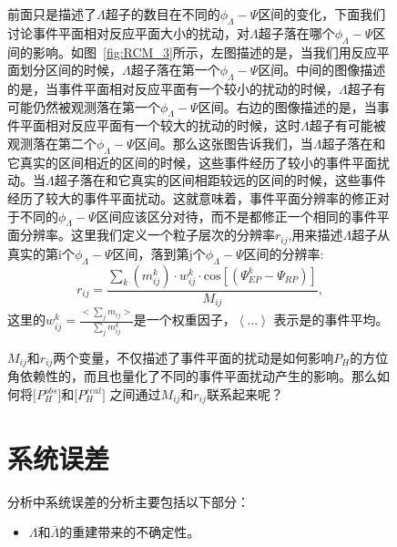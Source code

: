 \begin{figure}[htbp]
前面只是描述了$\Lambda$超子的数目在不同的$\phi_{\Lambda}-\Psi$区间的变化，下面我们讨论事件平面相对反应平面大小的扰动，对$\Lambda$超子落在哪个$\phi_{\Lambda}-\Psi$区间的影响。如图~\ref{fig:RCM_3}所示，左图描述的是，当我们用反应平面划分区间的时候，$\Lambda$超子落在第一个$\phi_{\Lambda}-\Psi$区间。中间的图像描述的是，当事件平面相对反应平面有一个较小的扰动的时候，$\Lambda$超子有可能仍然被观测落在第一个$\phi_{\Lambda}-\Psi$区间。右边的图像描述的是，当事件平面相对反应平面有一个较大的扰动的时候，这时$\Lambda$超子有可能被观测落在第二个$\phi_{\Lambda}-\Psi$区间。那么这张图告诉我们，当$\Lambda$超子落在和它真实的区间相近的区间的时候，这些事件经历了较小的事件平面扰动。当$\Lambda$超子落在和它真实的区间相距较远的区间的时候，这些事件经历了较大的事件平面扰动。这就意味着，事件平面分辨率的修正对于不同的$\phi_{\Lambda}-\Psi$区间应该区分对待，而不是都修正一个相同的事件平面分辨率。这里我们定义一个粒子层次的分辨率$r_{ij}$,用来描述$\Lambda$超子从真实的第i个$\phi_{\Lambda}-\Psi$区间，落到第j个$\phi_{\Lambda}-\Psi$区间的分辨率:
\begin{equation}
\label{eq:r_ij}
r_{ij} = \frac{\sum_{k} (m^{k}_{ij}) \cdot w_{ij}^k \cdot \mathrm{cos}[(\Psi_{EP}^{k} - \Psi_{RP})]} {M_{ij}} ,
\end{equation}
这里的$w_{ij}^k = \frac{<\sum_{j}m_{ij}>}{\sum_{j}m_{ij}^{k}}$是一个权重因子，$\left\langle\dots\right\rangle$ 表示是的事件平均。

$M_{ij}$和$r_{ij}$两个变量，不仅描述了事件平面的扰动是如何影响$P_{H}$的方位角依赖性的，而且也量化了不同的事件平面扰动产生的影响。那么如何将$\Big[ P_{H}^{obs} \Big]$和$[ P_{H}^{real} \Big ]$ 之间通过$M_{ij}$和$r_{ij}$联系起来呢？




\section{系统误差}
分析中系统误差的分析主要包括以下部分：
\begin{itemize}
\item $\Lambda$和$\bar{\Lambda}$的重建带来的不确定性。


\end{itemize}
\end{figure}
